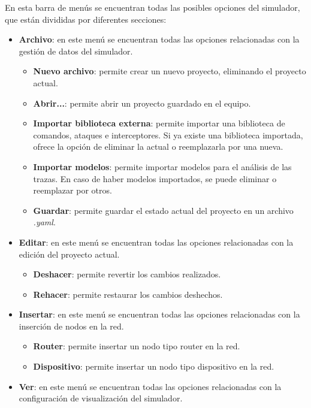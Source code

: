 En esta barra de menús se encuentran todas las posibles opciones del simulador, que están divididas por diferentes secciones:
\begin{itemize}
    \item \textbf{Archivo}: en este menú se encuentran todas las opciones relacionadas con la gestión de datos del simulador.
    \begin{itemize}
        \item \textbf{Nuevo archivo}: permite crear un nuevo proyecto, eliminando el proyecto actual.
        \item \textbf{Abrir...}: permite abrir un proyecto guardado en el equipo.
        \item \textbf{Importar biblioteca externa}: permite importar una biblioteca de comandos, ataques e interceptores. Si ya existe una biblioteca importada, ofrece la opción de eliminar la actual o reemplazarla por una nueva.
        \item \textbf{Importar modelos}: permite importar modelos para el análisis de las trazas. En caso de haber modelos importados, se puede eliminar o reemplazar por otros.
        \item \textbf{Guardar}: permite guardar el estado actual del proyecto en un archivo \textit{.yaml}.
    \end{itemize}
    \item \textbf{Editar}: en este menú se encuentran todas las opciones relacionadas con la edición del proyecto actual.
    \begin{itemize}
        \item \textbf{Deshacer}: permite revertir los cambios realizados.
        \item \textbf{Rehacer}: permite restaurar los cambios deshechos.
    \end{itemize}
    \item \textbf{Insertar}: en este menú se encuentran todas las opciones relacionadas con la inserción de nodos en la red.
    \begin{itemize}
        \item \textbf{Router}: permite insertar un nodo tipo router en la red.
        \item \textbf{Dispositivo}: permite insertar un nodo tipo dispositivo en la red.
    \end{itemize}
    \item \textbf{Ver}: en este menú se encuentran todas las opciones relacionadas con la configuración de visualización del simulador.
    \begin{itemize}

\end{itemize}
\end{itemize}

